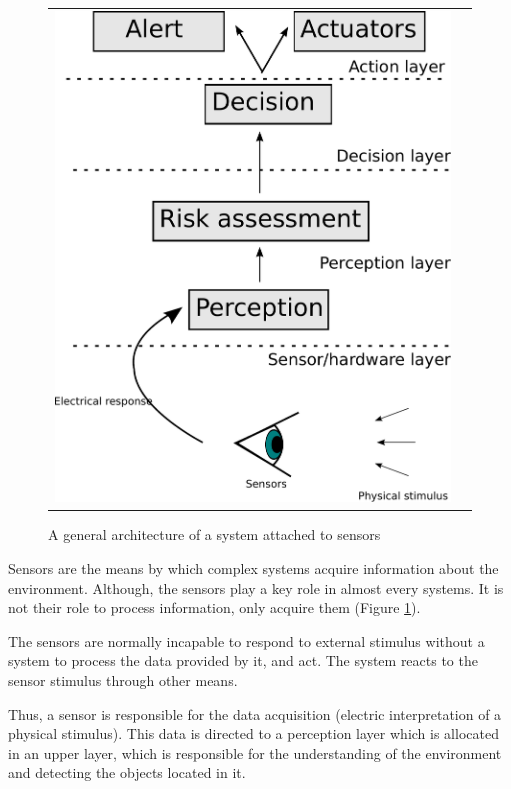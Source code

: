 \begin{figure}[h]
   \centering
     \begin{tabular}{lr}
       \includegraphics[scale=0.45]{img/fig:sensors:roles}
     \end{tabular}
   \caption{A general architecture of a system attached to sensors}
   \label{fig:sensors:role}
 \end{figure}

Sensors are the means by which complex systems acquire information about the environment. Although, the sensors play a key role in almost every systems. It is not their role to process information, only acquire them (Figure \ref{fig:sensors:role}). 

The sensors are normally incapable to respond to external stimulus without a system to process the data provided by it, and act. The system reacts to the sensor stimulus through other means.

Thus, a sensor is responsible for the data acquisition (electric interpretation of a physical stimulus). This data is directed to a perception layer which is allocated in an upper layer, which is responsible for the understanding of the environment and detecting the objects located in it. 

